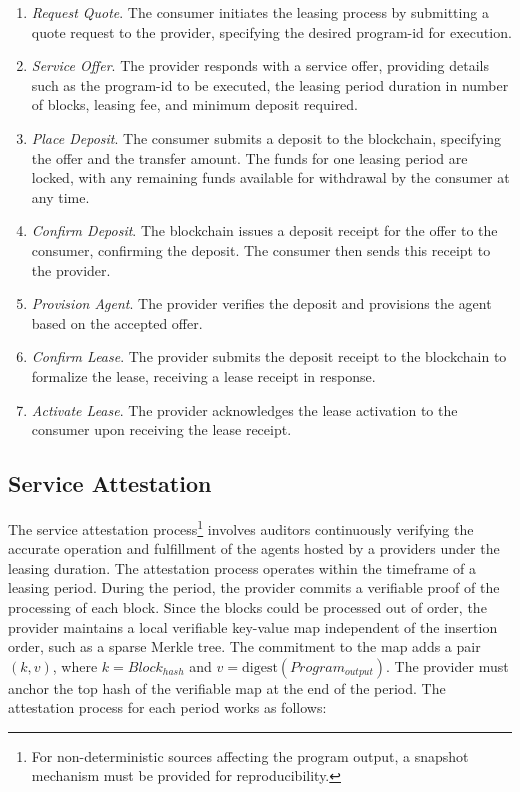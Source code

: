 \documentclass{oc}
\begin{document}
\begin{enumerate}
  \item \emph{Request Quote}. The \gls{consumer} initiates the leasing process by submitting a quote request to the \gls{provider}, specifying the desired \gls{program-id} for execution.
  
  \item \emph{Service Offer}. The \gls{provider} responds with a service offer, providing details such as the \gls{program-id} to be executed, the leasing period duration in number of blocks, leasing fee, and minimum deposit required.
  
  \item \emph{Place Deposit}. The \gls{consumer} submits a deposit to the blockchain, specifying the offer and the transfer amount. The funds for one leasing period are locked, with any remaining funds available for withdrawal by the consumer at any time.
  
  \item \emph{Confirm Deposit}. The blockchain issues a deposit receipt for the offer to the \gls{consumer}, confirming the deposit. The \gls{consumer} then sends this receipt to the \gls{provider}.
  
  \item \emph{Provision Agent}. The \gls{provider} verifies the deposit and provisions the \gls{agent} based on the accepted offer.
  
  \item \emph{Confirm Lease}. The \gls{provider} submits the deposit receipt to the blockchain to formalize the lease, receiving a lease receipt in response.
  
  \item \emph{Activate Lease}. The \gls{provider} acknowledges the lease activation to the \gls{consumer} upon receiving the lease receipt.
\end{enumerate}

\subsection{Service Attestation}\label{sec:service-attestation}

The service attestation process\footnote{
  For non-deterministic sources affecting the program output, a snapshot mechanism must be provided for reproducibility.
} involves \glspl{auditor} continuously verifying the accurate operation and fulfillment of the agents hosted by a \glspl{provider} under the leasing duration.
The attestation process operates within the timeframe of a leasing period.
During the period, the provider commits a verifiable proof of the processing of each block.
Since the blocks could be processed out of order, the \gls{provider} maintains a local verifiable key-value map independent of the insertion order, such as a sparse Merkle tree\cite{cryptoeprint:2016/683}.
The commitment to the map adds a pair $(k, v)$, where $k=Block_{hash}$ and $v=\text{digest}(Program_{output})$.
The \gls{provider} must anchor the top hash of the verifiable map at the end of the period.
The attestation process for each period works as follows:
\end{document}
